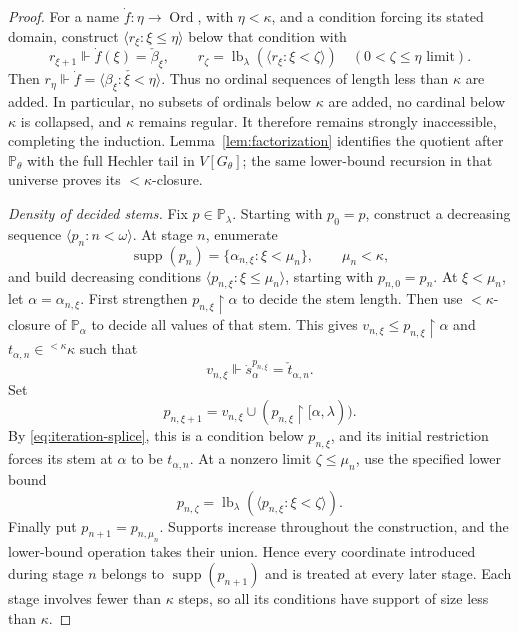 \documentclass[10pt,a4paper]{amsart}
\theoremstyle{definition}
\theoremstyle{remark}
\newcommand{\PP}{\mathbb P}
\DeclareMathOperator{\supp}{supp}
\DeclareMathOperator{\Ord}{Ord}
\begin{document}
\begin{proof}
For a name \(\dot f:\eta\to\Ord\), with \(\eta<\kappa\),
and a condition forcing its stated domain, construct
\(\langle r_\xi:\xi\leq\eta\rangle\) below that condition
with
\[
 r_{\xi+1}\Vdash\dot f(\xi)=\check\beta_\xi,
 \qquad
 r_\zeta=\operatorname{lb}_\lambda
                   (\langle r_\xi:\xi<\zeta\rangle)
                  \quad(0<\zeta\leq\eta\text{ limit}).
\]
Then
\(r_\eta\Vdash\dot f=
\check{\langle\beta_\xi:\xi<\eta\rangle}\).
Thus no ordinal sequences of length less than \(\kappa\)
are added. In particular, no subsets of ordinals below
\(\kappa\) are added, no cardinal below \(\kappa\) is
collapsed, and \(\kappa\) remains regular. It therefore remains
strongly inaccessible, completing the induction.
Lemma~\ref{lem:factorization}
identifies the quotient after \(\PP_\theta\) with the full
Hechler tail in \(V[G_\theta]\); the same lower-bound
recursion in that universe proves its \(<\kappa\)-closure.

\emph{Density of decided stems.}
Fix \(p\in\PP_\lambda\). Starting with \(p_0=p\), construct
a decreasing sequence \(\langle p_n:n<\omega\rangle\).
At stage \(n\), enumerate
\[
 \supp(p_n)=\{\alpha_{n,\xi}:\xi<\mu_n\},
                         \qquad\mu_n<\kappa,
\]
and build decreasing conditions
\(\langle p_{n,\xi}:\xi\leq\mu_n\rangle\), starting with
\(p_{n,0}=p_n\). At \(\xi<\mu_n\), let
\(\alpha=\alpha_{n,\xi}\). First strengthen
\(p_{n,\xi}\restriction\alpha\) to decide the stem length.
Then use \(<\kappa\)-closure of \(\PP_\alpha\) to decide
all values of that stem. This gives
\(v_{n,\xi}\leq p_{n,\xi}\restriction\alpha\) and
\(t_{\alpha,n}\in{}^{<\kappa}\kappa\) such that
\[
 v_{n,\xi}\Vdash
                    \dot s_\alpha^{p_{n,\xi}}=\check t_{\alpha,n}.
\]
Set
\[
 p_{n,\xi+1}=v_{n,\xi}
                   \cup(p_{n,\xi}\restriction[\alpha,\lambda)).
\]
By \eqref{eq:iteration-splice}, this is a condition below
\(p_{n,\xi}\), and its initial restriction forces its stem
at \(\alpha\) to be \(t_{\alpha,n}\). At a nonzero limit
\(\zeta\leq\mu_n\), use the specified lower bound
\[
 p_{n,\zeta}=\operatorname{lb}_\lambda
                   (\langle p_{n,\xi}:\xi<\zeta\rangle).
\]
Finally put \(p_{n+1}=p_{n,\mu_n}\).
Supports increase throughout the construction, and the lower-bound
operation takes their union. Hence every coordinate introduced
during stage \(n\) belongs to \(\supp(p_{n+1})\) and is
treated at every later stage. Each stage involves fewer than
\(\kappa\) steps, so all its conditions have support of size less
than \(\kappa\).


\end{proof}
\end{document}
